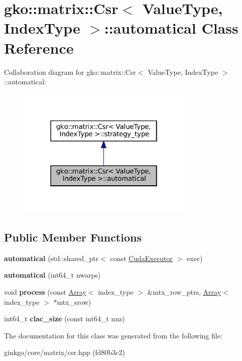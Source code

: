 \hypertarget{classgko_1_1matrix_1_1Csr_1_1automatical}{}\section{gko\+:\+:matrix\+:\+:Csr$<$ Value\+Type, Index\+Type $>$\+:\+:automatical Class Reference}
\label{classgko_1_1matrix_1_1Csr_1_1automatical}


Collaboration diagram for gko\+:\+:matrix\+:\+:Csr$<$ Value\+Type, Index\+Type $>$\+:\+:automatical\+:
\nopagebreak
\begin{figure}[H]
\begin{center}
\leavevmode
\includegraphics[width=238pt]{classgko_1_1matrix_1_1Csr_1_1automatical__coll__graph}
\end{center}
\end{figure}
\subsection*{Public Member Functions}
\begin{DoxyCompactItemize}
\item 
\mbox{\label{classgko_1_1matrix_1_1Csr_1_1automatical_a5e3cff9dc55b22b01ddf3db31731b267}} 
{\bfseries automatical} (std\+::shared\+\_\+ptr$<$ const \hyperlink{classgko_1_1CudaExecutor}{Cuda\+Executor} $>$ exec)
\item 
\mbox{\label{classgko_1_1matrix_1_1Csr_1_1automatical_af69e7b41ae7edd4d89c9a41763eb8ed9}} 
{\bfseries automatical} (int64\+\_\+t nwarps)
\item 
\mbox{\label{classgko_1_1matrix_1_1Csr_1_1automatical_adfc6b9f6bc311a1dedb758009a541741}} 
void {\bfseries process} (const \hyperlink{classgko_1_1Array}{Array}$<$ index\+\_\+type $>$ \&mtx\+\_\+row\+\_\+ptrs, \hyperlink{classgko_1_1Array}{Array}$<$ index\+\_\+type $>$ $\ast$mtx\+\_\+srow)
\item 
\mbox{\label{classgko_1_1matrix_1_1Csr_1_1automatical_af4ea78545a4fbdacfb75951fe3d0a701}} 
int64\+\_\+t {\bfseries clac\+\_\+size} (const int64\+\_\+t nnz)
\end{DoxyCompactItemize}


The documentation for this class was generated from the following file\+:\begin{DoxyCompactItemize}
\item 
ginkgo/core/matrix/csr.\+hpp (fd80b3c2)\end{DoxyCompactItemize}
